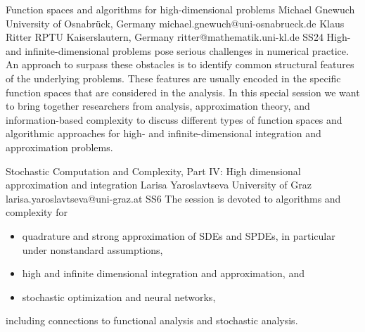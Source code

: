 \documentclass[12pt,a4paper,figuresright]{book}
\begin{document}



\clearpage



\begin{session}
    {Function spaces and algorithms for high-dimensional problems}%
    {Michael Gnewuch}%
    {University of Osnabr\"uck, Germany}%
    {michael.gnewuch@uni-osnabrueck.de}%
    {Klaus Ritter }%
    {RPTU Kaiserslautern, Germany}%
    {ritter@mathematik.uni-kl.de}%
    {SS24}
    {}%
  High- and infinite-dimensional problems pose serious challenges in numerical practice. An approach to surpass these obstacles is to identify common structural features of the underlying problems. These features are usually encoded in the specific function spaces that are considered in the analysis.
  In this special session we want to bring together researchers from analysis, approximation theory, and information-based complexity to discuss different types of function spaces and algorithmic approaches for high- and infinite-dimensional integration and approximation problems.
\end{session}




\clearpage

\iffalse
\begin{session}
 {Stochastic Computation and Complexity, Part IV: High dimensional approximation and integration}%
 {Larisa Yaroslavtseva}%
 {University of Graz}%
 {larisa.yaroslavtseva@uni-graz.at}%
 {}%
 {}%
 {}%
 {SS6}
 {}%
The session is devoted to algorithms and complexity for
\begin{itemize}[itemsep=0pt,topsep=0pt]
 \item quadrature and strong approximation of SDEs and SPDEs, in particular under nonstandard assumptions,

 \item high and infinite dimensional integration and approximation, and

 \item stochastic optimization and neural networks,
\end{itemize}
including connections to functional analysis and stochastic analysis.
\end{session}
\end{document}
